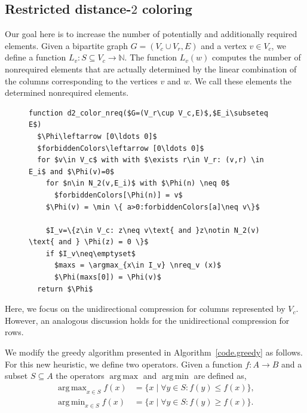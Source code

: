 \documentclass[12pt, twoside,a4paper,toc=bibliography]{scrbook}
\DeclareMathOperator*{\argmin}{arg\,min}
\DeclareMathOperator*{\argmax}{arg\,max}
\newcommand{\defref}[1]{Definition~\protect\ref{#1}}
\newcommand{\coderef}[1]{Algorithm~\protect\ref{#1}}
\newcommand{\nreq}{L}
\begin{document}
\subsection{Restricted distance-$2$ coloring}
Our goal here is to increase the number of potentially and additionally required elements.
Given a bipartite graph $G=(V_c\cup V_r,E)$ and a vertex $v\in V_c$,
we define a function $\nreq_v:S\subseteq V_c\rightarrow \mathbb{N}$.
The function $\nreq_v(w)$ computes the number of nonrequired elements
that are actually determined by
the linear combination of the columns corresponding to the vertices $v$ and $w$.
We call these elements the determined nonrequired elements.
\begin{figure}
\begin{lstlisting}[caption=New coloring heuristic for distance-$2$ coloring
considering the nonrequired elements.,label=code.new.d2.nreq,mathescape]
function d2_color_nreq($G=(V_r\cup V_c,E)$,$E_i\subseteq E$)
  $\Phi\leftarrow [0\ldots 0]$
  $forbiddenColors\leftarrow [0\ldots 0]$
  for $v\in V_c$ with with $\exists r\in V_r: (v,r) \in E_i$ and $\Phi(v)=0$
    for $n\in N_2(v,E_i)$ with $\Phi(n) \neq 0$
      $forbiddenColors[\Phi(n)] = v$
    $\Phi(v) = \min \{ a>0:forbiddenColors[a]\neq v\}$

    $I_v=\{z\in V_c: z\neq v\text{ and }z\notin N_2(v) \text{ and } \Phi(z) = 0 \}$
    if $I_v\neq\emptyset$
      $maxs = \argmax_{x\in I_v} \nreq_v (x)$
      $\Phi(maxs[0]) = \Phi(v)$
  return $\Phi$
\end{lstlisting}
\end{figure}
Here, we focus on the unidirectional compression for columns represented by $V_c$.
However, an analogous discussion holds for the unidirectional compression for rows.

We modify the greedy algorithm  presented in \coderef{code.greedy} as follows.
For this new heuristic, we define two operators.
Given a function $f:A\rightarrow B$ and a subset $S\subseteq A$
the operators $\argmax$ and $\argmin$ are defined as,
\begin{equation*}
\begin{split}
\argmax_{x\in S} f(x) &= \{ x \mid \forall y\in S: f(y) \leq f(x)\}, \\
\argmin_{x\in S} f(x) &= \{ x \mid \forall y\in S: f(y) \geq f(x)\}.
\end{split}
\end{equation*}
\end{document}

